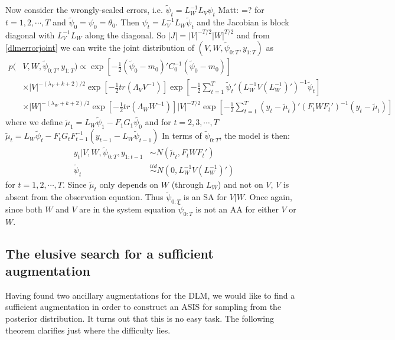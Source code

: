 \documentclass{article}
\newcommand{\matt}[1]{{\color{red} Matt: #1}}
\begin{document}
Now consider the wrongly-scaled errors, i.e. $\tilde{\psi}_t=L_W^{-1}L_V\psi_t$\matt{=?} for $t=1,2,\cdots,T$ and $\tilde{\psi}_0=\psi_0=\theta_0$. Then $\psi_t = L_V^{-1}L_W\tilde{\psi}_t$ and the Jacobian is block diagonal with $L_V^{-1}L_W$ along the diagonal. So $|J|=|V|^{-T/2}|W|^{T/2}$ and from \eqref{dlmerrorjoint} we can write the joint distribution of $(V, W, \tilde{\psi}_{0:T}, y_{1:T})$ as
\begin{align}
    p(&V,W,\tilde{\psi}_{0:T},y_{1:T}) \propto \exp\left[-\frac{1}{2}(\tilde{\psi}_0-m_0)'C_0^{-1}(\tilde{\psi}_0-m_0)\right] \nonumber\\
   &\times |V|^{-(\lambda_V + k + 2)/2}\exp\left[-\frac{1}{2}tr\left(\Lambda_VV^{-1}\right)\right] \exp\left[-\frac{1}{2}\sum_{t=1}^T\tilde{\psi}_t'(L_W^{-1}V(L_W^{-1})')^{-1}\tilde{\psi}_t\right] \nonumber\\
    & \times |W|^{-(\lambda_W + k + 2)/2}\exp\left[-\frac{1}{2}tr\left(\Lambda_WW^{-1}\right)\right] |V|^{-T/2}\exp\left[-\frac{1}{2}\sum_{t=1}^T(y_t - \tilde{\mu}_t)'(F_tWF_t')^{-1}(y_t-\tilde{\mu}_t)\right]\label{dlmerrortildejoint}
 \end{align}
where we define $\tilde{\mu}_1 = L_W\tilde{\psi}_1 - F_1G_1\tilde{\psi_0}$ and for $t=2,3,\cdots,T$ $\tilde{\mu}_t =L_W\tilde{\psi}_t - F_tG_tF_{t-1}^{-1}(y_{t-1} - L_{W}\tilde{\psi}_{t-1})$ In terms of $\tilde{\psi}_{0:T}$, the model is then:
 \begin{align*}
   y_t|V,W,\tilde{\psi}_{0:T},y_{1:t-1} &\sim N(\tilde{\mu}_t, F_tWF_t')\\
   \tilde{\psi}_t & \stackrel{iid}{\sim} N(0,L_W^{-1}V(L_W^{-1})')
\end{align*}
for $t=1,2,\cdots,T$. Since $\tilde{\mu}_t$ only depends on $W$ (through $L_W$) and not on $V$, $V$ is absent from the observation equation. Thus $\tilde{\psi}_{0:T}$ is an SA for $V|W$. Once again, since both $W$ and $V$ are in the system equation $\tilde{\psi}_{0:T}$ is not an AA for either $V$ or $W$.

\subsection{The elusive search for a sufficient augmentation}

Having found two ancillary augmentations for the DLM, we would like to find a sufficient augmentation in order to construct an ASIS for sampling from the posterior distribution. It turns out that this is no easy task. The following theorem clarifies just where the difficulty lies.
\end{document}
